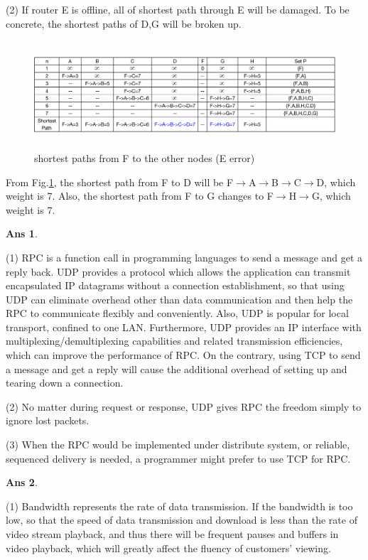 \documentclass[11pt]{article} %
\newcommand{\reffig}[1]{Fig.\ref{#1}}
\newtheorem{Q}{Ans}
\begin{document}
 (2)
 If router E is offline, all of shortest path through E will be damaged. To be concrete, the shortest paths of D,G will be broken up. 
 
  \begin{figure}[htbp]
 \centering
\includegraphics[height=4cm,width=15cm]{img/shortestpath2.png}
\caption{shortest paths from F to the other nodes (E error) }\label{shortestpath2}
 \end{figure}
 
 From \reffig{shortestpath2}, the shortest path from F to D will be F$\rightarrow$A$\rightarrow$B$\rightarrow$C$\rightarrow$D, which weight is 7. Also, the shortest path from F to G changes to F$\rightarrow$H$\rightarrow$G, which weight is 7.
 
 \begin{Q}
 \end{Q}
 
 (1)
 RPC is a function call in programming languages to send a message and get a reply back. UDP provides a protocol which allows the application can transmit encapsulated IP datagrams without a connection establishment, so that using UDP can eliminate overhead other than data communication and then help the RPC to communicate flexibly and  conveniently. Also, UDP is popular for local transport, confined to one LAN.  Furthermore, UDP provides an IP interface with multiplexing/demultiplexing capabilities and related transmission efficiencies, which can improve the performance of RPC. On the contrary, using TCP to send a message and get a reply will cause the additional overhead of setting up and tearing down a connection. 

(2) No matter during request or response, UDP gives RPC the freedom simply to ignore lost packets.

(3) When the RPC would be implemented under distribute system, or reliable, sequenced delivery is needed, a programmer might prefer to use TCP for RPC.

 \begin{Q}
 \end{Q}
 
 (1) 
 Bandwidth represents the rate of data transmission. If the bandwidth is too low, so that the speed of data transmission and download is less than the rate of video stream playback, and thus there will be frequent pauses and buffers in video playback, which will greatly affect the fluency of customers' viewing.
 
\end{document}
